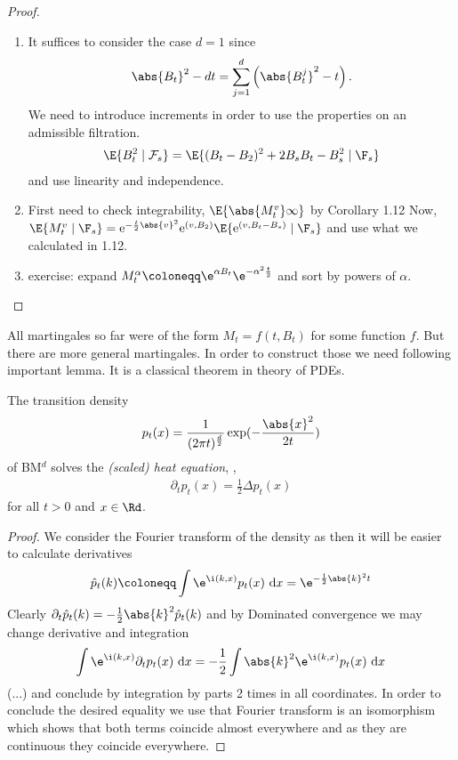\begin{proof}
\begin{enumerate}[label=\roman*)]
\item It suffices to consider the case $d=1$ since
\begin{align*}
\abs{B_t}^2-dt=\sum_{j=1}^d \left(\abs{B_t^j}^2-t\right).
\end{align*}
We need to introduce increments in order to use the properties on an admissible filtration.
\begin{align*}
\E{B_t^2\mid \mathcal{F}_s}=\E{(B_t-B_2)^2 +2 B_s B_t-B_s^2 \mid \F_s}
\end{align*}
and use linearity and independence.
\item First need to check integrability, $\E{\abs{M_t^v}\infty}$ by Corollary 1.12
Now, $\E{M_t^v\mid \F_s}=\mathrm{e}^{-\frac{t}{2}\abs{v}^2} \mathrm{e}^{(v,B_2)} \E{\mathrm{e}^{(v,B_t-B_s)}\mid \F_s}$
and use what we calculated in 1.12.
\item exercise: expand $M_t^\alpha\coloneqq \e^{\alpha B_t}\e^{-\alpha^2 \frac{t}{2}}$
and sort by powers of $\alpha$.
\end{enumerate}
\end{proof}

All martingales so far were of the form $M_t=f(t,B_t)$ for some function $f$.
But there are more general martingales.
In order to construct those we need following important lemma.
It is a classical theorem in theory of PDEs.

\begin{lem}
The transition density
\begin{align*}
p_t(x)=\frac{1}{(2\pi t)^\frac{d}{2}} \exp(-\frac{\abs{x}^2}{2t})
\end{align*}
of BM$^d$ solves the \emph{(scaled) heat equation}, \ie ,
\begin{align*}
\partial_t p_t(x)=\frac{1}{2}\Delta p_t(x)
\end{align*}
for all $t>0$ and $x \in \Rd$.
\end{lem}
\begin{proof}
We consider the Fourier transform of the density as then it will be easier to calculate derivatives
\begin{align*}
\hat{p}_t(k)\coloneqq \int \e^{\i(k,x)}p_t(x)~\mathrm{d}x=\e^{-\frac{1}{2}\abs{k}^2t}
\end{align*}
Clearly $\partial_t \hat{p}_t(k)=-\frac{1}{2}\abs{k}^2\hat{p}_t(k)$ and by Dominated convergence we may change derivative and integration
\begin{align*}
\int \e^{\i(k,x)}\partial_t p_t(x)~\mathrm{d}x=-\frac{1}{2}\int \abs{k}^2 \e^{\i(k,x)} p_t(x)~\mathrm{d}x
\end{align*}
(...)
and conclude by integration by parts 2 times in all coordinates.
In order to conclude the desired equality we use that Fourier transform is an isomorphism which shows that both terms coincide almost everywhere  and as they are continuous they coincide everywhere.
\end{proof}

